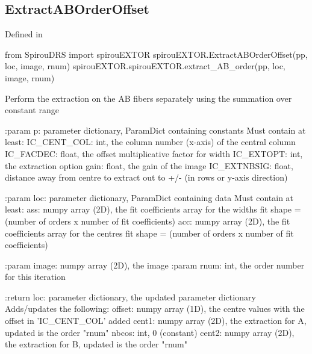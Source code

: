 \noindent\begin{minipage}{\textwidth}
\subsection{ExtractABOrderOffset}

Defined in \spirouEXTOR{}

\begin{pythonbox}
from SpirouDRS import spirouEXTOR
spirouEXTOR.ExtractABOrderOffset(pp, loc, image, rnum)
spirouEXTOR.spirouEXTOR.extract_AB_order(pp, loc, image, rnum)
\end{pythonbox}

\begin{pythondocstring}
Perform the extraction on the AB fibers separately using the summation
over constant range

:param p: parameter dictionary, ParamDict containing constants
    Must contain at least:
            IC_CENT_COL: int, the column number (x-axis) of the central
                         column
            IC_FACDEC: float, the offset multiplicative factor for width
            IC_EXTOPT: int, the extraction option
            gain: float, the gain of the image
            IC_EXTNBSIG: float, distance away from centre to extract
                         out to +/- (in rows or y-axis direction)

:param loc: parameter dictionary, ParamDict containing data
        Must contain at least:
            ass: numpy array (2D), the fit coefficients array for
                  the widths fit
                  shape = (number of orders x number of fit coefficients)
            acc: numpy array (2D), the fit coefficients array for
                  the centres fit
                  shape = (number of orders x number of fit coefficients)


:param image: numpy array (2D), the image
:param rnum: int, the order number for this iteration

:return loc: parameter dictionary, the updated parameter dictionary
        Adds/updates the following:
            offset: numpy array (1D), the centre values with the
                    offset in 'IC_CENT_COL' added
            cent1: numpy array (2D), the extraction for A, updated is
                   the order "rnum"
            nbcos: int, 0 (constant)
            cent2: numpy array (2D), the extraction for B, updated is
                   the order "rnum"
\end{pythondocstring}
\end{minipage}

